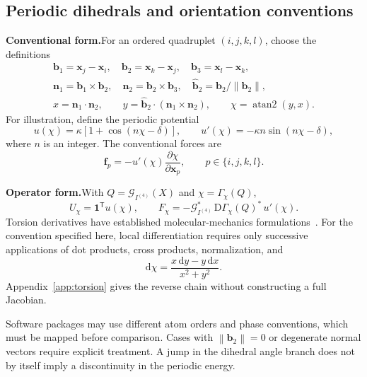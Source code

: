 \documentclass[11pt,a4paper]{article}
\newcommand{\oldform}{\par\noindent\textbf{Conventional form.}\quad}
\newcommand{\newform}{\par\noindent\textbf{Operator form.}\quad}
\newcommand{\ones}{\mathbf 1}
\newcommand{\dd}{\mathrm d}
\newcommand{\atan}{\operatorname{atan2}}
\newcommand{\norm}[1]{\left\lVert #1\right\rVert}
\newcommand{\vect}[1]{\bm{#1}}
\theoremstyle{definition}
\begin{document}
\subsection{Periodic dihedrals and orientation conventions}
\oldform For an ordered quadruplet $(i,j,k,l)$, choose the definitions
\begin{gather}
\vect b_1=\vect x_j-\vect x_i,\quad
\vect b_2=\vect x_k-\vect x_j,\quad
\vect b_3=\vect x_l-\vect x_k,\\
\vect n_1=\vect b_1\times\vect b_2,\quad
\vect n_2=\vect b_2\times\vect b_3,\quad
\widehat{\vect b}_2=\vect b_2/\norm{\vect b_2},\\
x=\vect n_1\cdot\vect n_2,\qquad
y=\widehat{\vect b}_2\cdot(\vect n_1\times\vect n_2),\qquad
\chi=\atan(y,x).
\label{eq:dihedral-definition}
\end{gather}
For illustration, define the periodic potential
\begin{equation}
u(\chi)=\kappa[1+\cos(n\chi-\delta)],\qquad
u'(\chi)=-\kappa n\sin(n\chi-\delta),
\end{equation}
where $n$ is an integer. The conventional forces are
\begin{equation}
\vect f_p=-u'(\chi)\frac{\partial\chi}{\partial\vect x_p},
\qquad p\in\{i,j,k,l\}.
\end{equation}
\newform With $Q=\mathcal G_{I^{(4)}}(X)$ and $\chi=\Gamma_\chi(Q)$,
\begin{equation}
U_\chi=\ones^{\mathsf T}u(\chi),\qquad
F_\chi=-\mathcal G_{I^{(4)}}^*\,
\mathrm D\Gamma_\chi(Q)^*\,u'(\chi).
\label{eq:dihedral-reform}
\end{equation}
Torsion derivatives have established molecular-mechanics formulations~\cite{blondel1996}.
For the convention specified here, local differentiation requires only successive applications of dot products, cross products,
normalization, and
\begin{equation}
\dd\chi=\frac{x\,\dd y-y\,\dd x}{x^2+y^2}.
\label{eq:atan-derivative}
\end{equation}
Appendix~\ref{app:torsion} gives the reverse chain without constructing a full Jacobian.

Software packages may use different atom orders and phase conventions, which must be mapped
before comparison. Cases with $\norm{\vect b_2}=0$ or degenerate normal vectors require explicit
treatment. A jump in the dihedral angle branch does not by itself imply a discontinuity in the
periodic energy.
\end{document}
